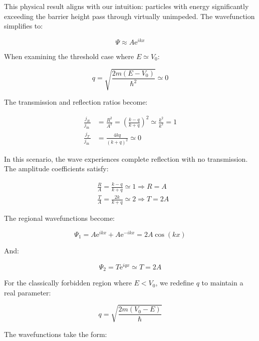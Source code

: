 \documentclass[italian]{HKNdocument}
\begin{document}
This physical result aligns with our intuition: particles with energy significantly exceeding the barrier height pass through virtually unimpeded. The wavefunction simplifies to:

\begin{equation}
\Psi \approx A \mathrm{e}^{i k x}
\end{equation}

When examining the threshold case where $E \simeq V_{0}$:

\begin{equation}
q=\sqrt{\frac{2 m\left(E-V_{0}\right)}{\hbar^{2}}} \simeq 0
\end{equation}

The transmission and reflection ratios become:

\begin{align}
\frac{j_{R}}{j_{\text {in }}} & =\frac{R^{2}}{A^{2}}=\left(\frac{k-q}{k+q}\right)^{2} \simeq \frac{k^{2}}{k^{2}}=1  \\
\frac{j_{T}}{j_{\text {in }}} & =\frac{4 k q}{(k+q)^{2}} \simeq 0
\end{align}

In this scenario, the wave experiences complete reflection with no transmission. The amplitude coefficients satisfy:

\begin{align}
& \frac{R}{A}=\frac{k-q}{k+q} \simeq 1 \Longrightarrow R=A  \\
& \frac{T}{A}=\frac{2 k}{k+q} \simeq 2 \Longrightarrow T=2 A
\end{align}

The regional wavefunctions become:

\begin{equation}
\Psi_{1}=A \mathrm{e}^{i k x}+A \mathrm{e}^{-i k x}=2 A \cos (k x)
\end{equation}

And:

\begin{equation}
\Psi_{2}=T \mathrm{e}^{i q x} \simeq T=2 A
\end{equation}

For the classically forbidden region where $E<V_{0}$, we redefine $q$ to maintain a real parameter:

\begin{equation}
q=\sqrt{\frac{2 m\left(V_{0}-E\right)}{\hbar}}
\end{equation}

The wavefunctions take the form:
\end{document}
